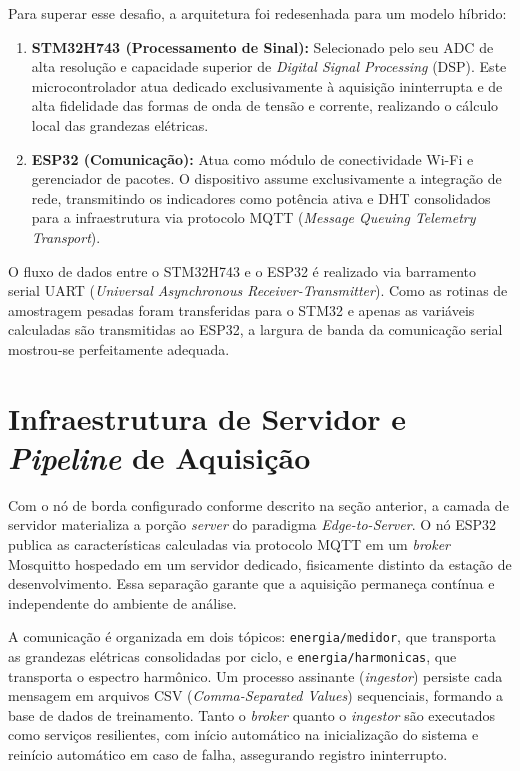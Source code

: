 \documentclass[12pt]{article}
\begin{document}
Para superar esse desafio, a arquitetura foi redesenhada para um modelo h\'ibrido:

\begin{enumerate}
  \item \textbf{STM32H743 (Processamento de Sinal):} Selecionado pelo seu ADC de
  alta resolu\c{c}\~ao e capacidade superior de \textit{Digital Signal Processing}
  (DSP). Este microcontrolador atua dedicado exclusivamente \`a aquisi\c{c}\~ao
  ininterrupta e de alta fidelidade das formas de onda de tens\~ao e corrente,
  realizando o c\'alculo local das grandezas el\'etricas.

  \item \textbf{ESP32 (Comunica\c{c}\~ao):} Atua como m\'odulo de conectividade
  Wi-Fi e gerenciador de pacotes. O dispositivo assume exclusivamente a
  integra\c{c}\~ao de rede, transmitindo os indicadores como pot\^encia ativa e
  DHT consolidados para a infraestrutura via protocolo MQTT
  (\textit{Message Queuing Telemetry Transport}).
\end{enumerate}

O fluxo de dados entre o STM32H743 e o ESP32 \'e realizado via barramento serial
UART (\textit{Universal Asynchronous Receiver-Transmitter}). Como as rotinas de
amostragem pesadas foram transferidas para o STM32 e apenas as vari\'aveis
calculadas s\~ao transmitidas ao ESP32, a largura de banda da comunica\c{c}\~ao
serial mostrou-se perfeitamente adequada.


\section{Infraestrutura de Servidor e \textit{Pipeline} de Aquisi\c{c}\~ao}

Com o n\'o de borda configurado conforme descrito na se\c{c}\~ao anterior, a camada
de servidor materializa a por\c{c}\~ao \textit{server} do paradigma
\textit{Edge-to-Server}. O n\'o ESP32 publica as caracter\'isticas calculadas
via protocolo MQTT em um \textit{broker} Mosquitto hospedado em um servidor
dedicado, fisicamente distinto da esta\c{c}\~ao de desenvolvimento. Essa
separa\c{c}\~ao garante que a aquisi\c{c}\~ao permane\c{c}a cont\'inua e
independente do ambiente de an\'alise.

A comunica\c{c}\~ao \'e organizada em dois t\'opicos: \texttt{energia/medidor},
que transporta as grandezas el\'etricas consolidadas por ciclo, e
\texttt{energia/harmonicas}, que transporta o espectro harm\^onico. Um processo
assinante (\textit{ingestor}) persiste cada mensagem em arquivos CSV
(\textit{Comma-Separated Values}) sequenciais, formando a base de dados de
treinamento. Tanto o \textit{broker} quanto o \textit{ingestor} s\~ao executados como
servi\c{c}os resilientes, com in\'icio autom\'atico na inicializa\c{c}\~ao do sistema
e rein\'icio autom\'atico em caso de falha, assegurando registro ininterrupto.
\end{document}
